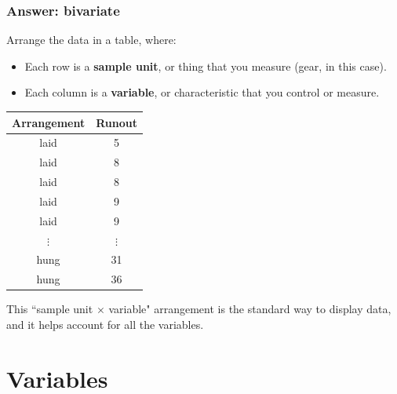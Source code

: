 \documentclass[handout]{beamer}
\numberwithin{equation}{section}
\begin{document}
\begin{frame}[fragile]
\frametitle{Answer: bivariate}

 \small
Arrange the data in a table, where:
\begin{itemize}
\item Each row is a {\bf sample unit}, or thing that you measure (gear, in this case).
\pause \item Each column is a {\bf variable}, or characteristic that you control or measure.
\end{itemize}

\pause \begin{center}
\begin{tabular}{cc}
Arrangement & Runout \\ \hline
laid & 5 \\
laid & 8 \\ 
laid & 8 \\ 
laid & 9 \\
laid & 9 \\ 
$\vdots$ & $\vdots$ \\ 
hung & 31 \\ 
hung & 36 \\
\end{tabular}
\end{center} 

This ``sample unit $\times$ variable" arrangement is the standard way to display data, and it helps account for all the variables.

\end{frame}

\section{Variables}
\end{document}
